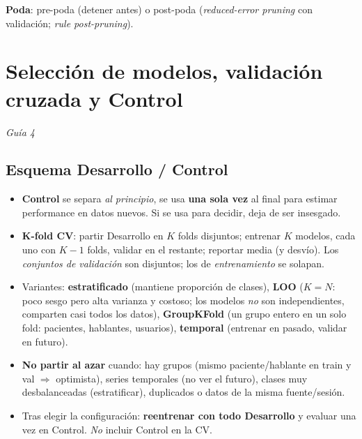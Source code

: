 \documentclass[10pt,a4paper]{article}
\newcommand{\guia}[1]{\hfill{\small\color{muted}\textit{Guía #1}}}
\begin{document}
\textbf{Poda}: pre-poda (detener antes) o post-poda (\emph{reduced-error pruning} con validación; \emph{rule post-pruning}).

\section{Selección de modelos, validación cruzada y Control}\guia{4}

\subsection{Esquema Desarrollo / Control}
\begin{center}
\end{center}
\begin{itemize}
  \item \textbf{Control} se separa \emph{al principio}, se usa \textbf{una sola vez} al final para estimar performance en datos nuevos. Si se usa para decidir, deja de ser insesgado.
  \item \textbf{K-fold CV}: partir Desarrollo en $K$ folds disjuntos; entrenar $K$ modelos, cada uno con $K-1$ folds, validar en el restante; reportar media (y desvío). Los \emph{conjuntos de validación} son disjuntos; los de \emph{entrenamiento} se solapan.
  \item Variantes: \textbf{estratificado} (mantiene proporción de clases), \textbf{LOO} ($K=N$: poco sesgo pero alta varianza y costoso; los modelos \emph{no} son independientes, comparten casi todos los datos), \textbf{GroupKFold} (un grupo entero en un solo fold: pacientes, hablantes, usuarios), \textbf{temporal} (entrenar en pasado, validar en futuro).
  \item \textbf{No partir al azar} cuando: hay grupos (mismo paciente/hablante en train y val $\Rightarrow$ optimista), series temporales (no ver el futuro), clases muy desbalanceadas (estratificar), duplicados o datos de la misma fuente/sesión.
  \item Tras elegir la configuración: \textbf{reentrenar con todo Desarrollo} y evaluar una vez en Control. \emph{No} incluir Control en la CV.
\end{itemize}
\end{document}
